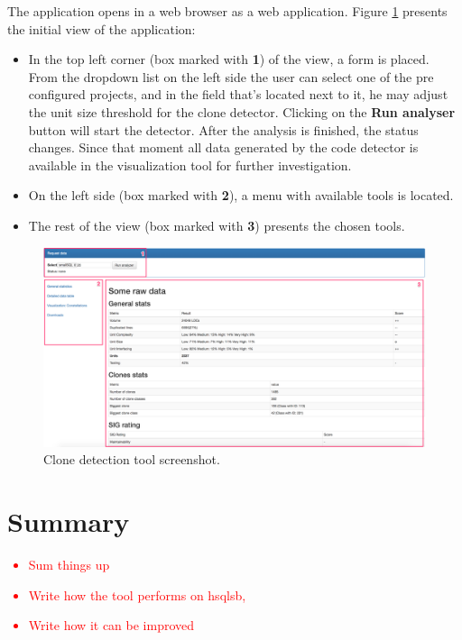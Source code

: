 \documentclass{uva-inf-article}
\newcommand\todo[1]{\textcolor{red}{#1}}
\begin{document}
The application opens in a web browser as a web application. Figure \ref{screenshot1} presents the initial view of the application:

\begin{itemize}

\item{In the top left corner (box marked with \textbf{1}) of the view, a form is placed. From the dropdown list on the left side the user can select one of the pre configured projects, and in the field that's located next to it, he may adjust the unit size threshold for the clone detector. Clicking on the \textbf{Run analyser} button will start the detector. After the analysis is finished, the status changes. Since that moment all data generated by the code detector is available in the visualization tool for further investigation. }

\item{On the left side (box marked with \textbf{2}), a menu with available tools is located. }
\item{The rest of the view (box marked with \textbf{3}) presents the chosen tools. }
\end{itemize}

\begin{figure}[t]
\includegraphics[width=\textwidth]{visualization1}
\centering
\caption{Clone detection tool screenshot.}
\label{screenshot1}
\end{figure}

\section{Summary}
\todo {
	\begin{itemize}
		\item{Sum things up}
		\item{Write how the tool performs on hsqlsb,}
		\item{Write how it can be improved}
	\end{itemize}
}
\end{document}
